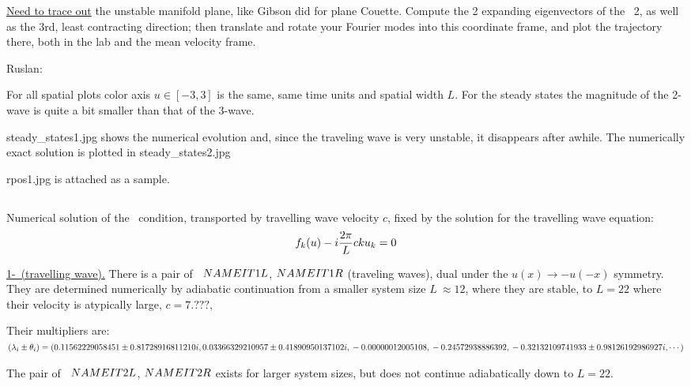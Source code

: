 \underline{Need to trace out}
the unstable manifold plane, like Gibson did for plane Couette.
Compute the 2 expanding eigenvectors of the
\eqv\ {\nameit}2, as well as the 3rd, least contracting direction; then
translate and rotate your Fourier modes into this coordinate frame,
and plot the trajectory there, both in the lab and the mean velocity frame.

Ruslan: %
% 

For all spatial plots color axis $u \in [-3, 3]$ is the same,
same time units and spatial width $L$.
For the steady states the magnitude of the 2-wave is quite 
a bit smaller than that of the 3-wave.

steady\_states1.jpg shows the numerical evolution and, since the
traveling wave is very unstable, it disappears after awhile. 
The numerically exact solution is plotted in steady\_states2.jpg

rpos1.jpg is attached as a sample. 

\subsection{\Reqva}

Numerical solution of the \reqv\  condition,
transported by travelling wave velocity $c$, 
fixed by the solution for the travelling wave equation:
\[
f_k(u) - i{2\pi\over L} c k u_k = 0
\]

\underline{1-\reqv\  (travelling wave).}
There is a pair of \Reqva\ 
${NAMEIT}1L$,
${NAMEIT}1R$
(traveling waves), dual under the
$u(x) \to -u(-x)$ symmetry. They are 
determined numerically by 
adiabatic continuation from a smaller system size
$L~\approx 12$,
where they are stable, to $L=22$
where their velocity is atypically large, $c=7.???$,

Their multipliers are:
$(\lambda_i \pm \theta_i)=
(
  0.11562229058451 \pm 0.81728916811210i,	\\
  0.03366329210957 \pm 0.41890950137102i,	\\
 -0.00000012005108                    ,	\\
 -0.24572938886392                    ,	\\
 -0.32132109741933 \pm 0.98126192986927i,
\cdots
)$

The pair of \Reqva\ 
${NAMEIT}2L$,
${NAMEIT}2R$
exists for larger system sizes, but does not continue 
adiabatically down to $L=22$.

